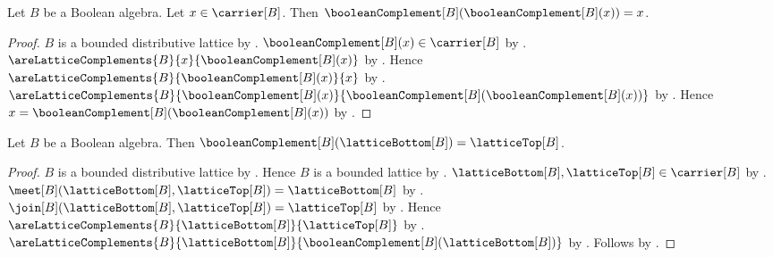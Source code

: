 \begin{theorem}\label{boolean_complement_involutive}
    Let $B$ be a Boolean algebra.
    Let $x\in\carrier[B]$.
    Then $\booleanComplement[B](\booleanComplement[B](x))=x$.
\end{theorem}
\begin{proof}
    $B$ is a bounded distributive lattice by
        .
    $\booleanComplement[B](x)\in\carrier[B]$ by
        .
    $\areLatticeComplements{B}{x}{\booleanComplement[B](x)}$ by
        .
    Hence $\areLatticeComplements{B}{\booleanComplement[B](x)}{x}$ by
        .
    $\areLatticeComplements
        {B}{\booleanComplement[B](x)}
        {\booleanComplement[B](\booleanComplement[B](x))}$ by
        .
    Hence $x=\booleanComplement[B](\booleanComplement[B](x))$ by
        .
\end{proof}

\begin{proposition}\label{boolean_complement_lattice_bottom}
    Let $B$ be a Boolean algebra.
    Then $\booleanComplement[B](\latticeBottom[B])
        =\latticeTop[B]$.
\end{proposition}
\begin{proof}
    $B$ is a bounded distributive lattice by
        .
    Hence $B$ is a bounded lattice by
        .
    $\latticeBottom[B],\latticeTop[B]\in\carrier[B]$ by
        .
    $\meet[B](\latticeBottom[B],\latticeTop[B])
        =\latticeBottom[B]$ by .
    $\join[B](\latticeBottom[B],\latticeTop[B])
        =\latticeTop[B]$ by .
    Hence $\areLatticeComplements
        {B}{\latticeBottom[B]}{\latticeTop[B]}$ by
        .
    $\areLatticeComplements
        {B}{\latticeBottom[B]}
        {\booleanComplement[B](\latticeBottom[B])}$ by
        .
    Follows by .
\end{proof}

